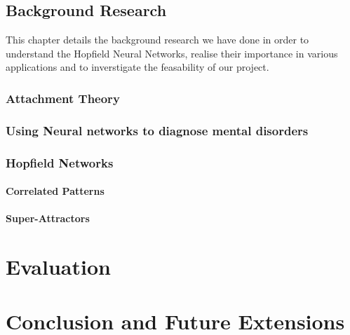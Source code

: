 \documentclass[11pt,a4paper,oneside]{report}
\begin{document}
\section{Background Research}
This chapter details the background research we have done in order to understand the Hopfield Neural Networks, realise their importance in various applications and to inverstigate the feasability of our project. 

\subsection{Attachment Theory}

\subsection{Using Neural networks to diagnose mental disorders}



\subsection{Hopfield Networks}

\subsubsection{Correlated Patterns}

\subsubsection{Super-Attractors}


\chapter{Evaluation}




\chapter{Conclusion and Future Extensions}
\end{document}
